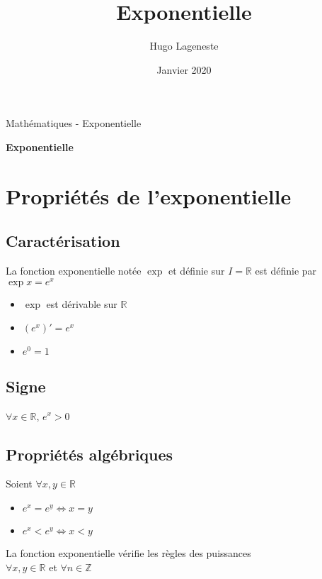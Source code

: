 \documentclass[a4paper]{article}
\title{Exponentielle}
\author{Hugo Lageneste}
\date{Janvier 2020}
\begin{document}
{Mathématiques - Exponentielle}

\begin{center}
 \newcommand{\HRule}{\rule{\linewidth}{0.5mm}}
 {\huge \bfseries Exponentielle}\\[0.1cm]
\end{center}

\section{Propriétés de l'exponentielle}
\subsection{Caractérisation}

{La fonction exponentielle notée $\exp{}$ et définie sur $I=\mathbb{R}$ est définie par $\exp{x}=e^x$}

\begin{multicols}{3}
	\begin{itemize}
  		\item{$\exp{}$ est dérivable sur $\mathbb{R}$}
  		\item{$\left(e^{x}\right)\prime=e^x$}
  		\item{$e^0=1$}
	\end{itemize}
\end{multicols}

\subsection{Signe}

{$\forall x \in \mathbb{R}$, $e^x > 0$}

\begin{center}
\end{center}

\subsection{Propriétés algébriques}

{Soient $\forall x, y \in \mathbb{R}$}

\begin{multicols}{2}
	\begin{itemize}
  		\item{$e^x = e^y \Leftrightarrow x=y$}
  		\item{$e^x < e^y \Leftrightarrow x < y$}
	\end{itemize}
\end{multicols}
{La fonction exponentielle vérifie les règles des puissances}\\
{$\forall x,y \in \mathbb{R}$ et $\forall n \in \mathbb{Z}$}
\end{document}
